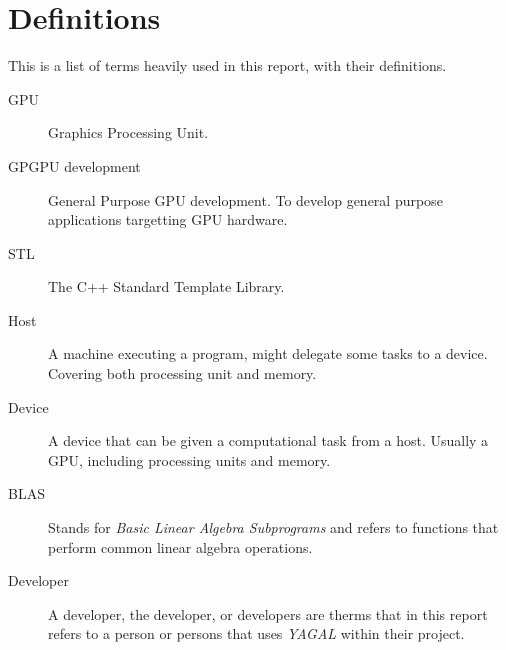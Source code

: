 \section*{Definitions}
This is a list of terms heavily used in this report, with their definitions.

\begin{description}
\item[GPU]
Graphics Processing Unit.
\item[GPGPU development]
General Purpose GPU development. To develop general purpose applications targetting GPU hardware.
\item[STL]
The C++ Standard Template Library.
\item[Host]
A machine executing a program, might delegate some tasks to a device. Covering both processing unit and memory.
\item[Device] 
A device that can be given a computational task from a host. Usually a GPU, including processing units and memory.
\item[BLAS]
Stands for \textit{Basic Linear Algebra Subprograms} and refers to functions that perform common linear algebra operations.
\item[Developer]
A developer, the developer, or developers are therms that in this report refers to a person or persons that uses \textit{YAGAL} within their project.
\end{description}
